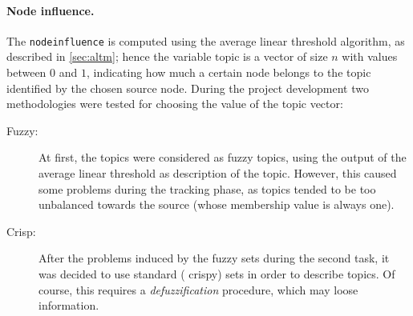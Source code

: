 \paragraph{\textbf{Node influence.}} The \texttt{\color{AlgProcedureColor}node\textunderscore{}influence} is computed using the average linear threshold algorithm, as described in \cref{sec:altm}; hence the variable $\mathrm{topic}$ is a vector of size $n$ with values between $0$ and $1$, indicating how much a certain node belongs to the topic identified by the chosen source node. During the project development two methodologies were tested for choosing the value of the topic vector:
\begin{description}
\item[Fuzzy:] At first, the topics were considered as fuzzy topics, using the output of the average linear threshold as description of the topic.
However, this caused some problems during the tracking phase, as topics tended to be too unbalanced towards the source (whose membership value is always one).
\item[Crisp:] After the problems induced by the fuzzy sets during the second task, it was decided to use standard (\ie{} crispy) sets in order to describe topics. Of course, this requires a \textit{defuzzification} procedure, which may loose information.
\end{description}



